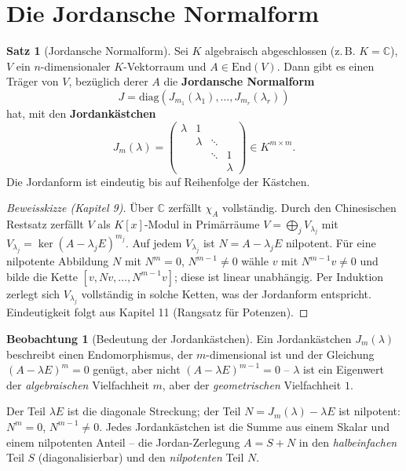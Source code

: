 ﻿\documentclass[a4paper,12pt]{report}
\theoremstyle{definition}
\newtheorem{satz}{Satz}
\newtheorem{beobachtung}{Beobachtung}
\begin{document}
\section{Die Jordansche Normalform}

\begin{satz}[Jordansche Normalform]
    Sei $K$ algebraisch abgeschlossen (z.\,B. $K = \mathbb{C}$),
    $V$ ein $n$-dimensionaler $K$-Vektorraum und $A \in \mathrm{End}(V)$.
    Dann gibt es einen Träger von $V$, bezüglich derer $A$ die
    \textbf{Jordansche Normalform}
    \[
        J = \mathrm{diag}(J_{m_1}(\lambda_1), \dots, J_{m_r}(\lambda_r))
    \]
    hat, mit den \textbf{Jordankästchen}
    \[
        J_m(\lambda) = \begin{pmatrix}
            \lambda & 1 & & \\
            & \lambda & \ddots & \\
            & & \ddots & 1 \\
            & & & \lambda
        \end{pmatrix} \in K^{m \times m}.
    \]
    Die Jordanform ist eindeutig bis auf Reihenfolge der Kästchen.
\end{satz}
\begin{proof}[Beweisskizze (Kapitel 9)]
    Über $\mathbb{C}$ zerfällt $\chi_A$ vollständig. Durch den Chinesischen
    Restsatz zerfällt $V$ als $K[x]$-Modul in Primärräume
    $V = \bigoplus_j V_{\lambda_j}$ mit $V_{\lambda_j} = \ker(A-\lambda_j E)^{m_j}$.
    Auf jedem $V_{\lambda_j}$ ist $N = A - \lambda_j E$ nilpotent.
    Für eine nilpotente Abbildung $N$ mit $N^m = 0$, $N^{m-1} \neq 0$
    wähle $v$ mit $N^{m-1}v \neq 0$ und bilde die Kette
    $[v, Nv, \ldots, N^{m-1}v]$; diese ist linear unabhängig.
    Per Induktion zerlegt sich $V_{\lambda_j}$ vollständig in solche Ketten,
    was der Jordanform entspricht. Eindeutigkeit folgt aus Kapitel 11 (Rangsatz für Potenzen).
\end{proof}


\begin{beobachtung}[Bedeutung der Jordankästchen]
    Ein Jordankästchen $J_m(\lambda)$ beschreibt einen Endomorphismus,
    der $m$-dimensional ist und der Gleichung $(A - \lambda E)^m = 0$
    genügt, aber nicht $(A - \lambda E)^{m-1} = 0$ -- $\lambda$ ist
    ein Eigenwert der \emph{algebraischen} Vielfachheit $m$, aber
    der \emph{geometrischen} Vielfachheit $1$.

    Der Teil $\lambda E$ ist die diagonale Streckung; der Teil
    $N = J_m(\lambda) - \lambda E$ ist nilpotent: $N^m = 0$, $N^{m-1} \neq 0$.
    Jedes Jordankästchen ist die Summe aus einem Skalar und einem
    nilpotenten Anteil -- die Jordan-Zerlegung $A = S + N$
    in den \emph{halbeinfachen} Teil $S$ (diagonalisierbar) und den
    \emph{nilpotenten} Teil $N$.
\end{beobachtung}
\end{document}
